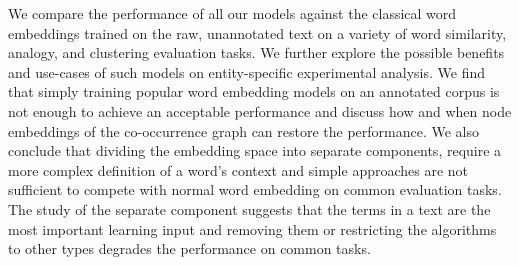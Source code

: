 We compare the performance of all our models against the classical word embeddings trained on the raw, unannotated text on a variety of word similarity, analogy, and clustering evaluation tasks. We further explore the possible benefits and use-cases of such models on entity-specific experimental analysis. We find that simply training popular word embedding models on an annotated corpus is not enough to achieve an acceptable performance and discuss how and when node embeddings of the co-occurrence graph can restore the performance. We also conclude that dividing the embedding space into separate components, require a more complex definition of a word's context and simple approaches are not sufficient to compete with normal word embedding on common evaluation tasks. The study of the separate component suggests that the terms in a text are the most important learning input and removing them or restricting the algorithms to other types degrades the performance on common tasks. 

